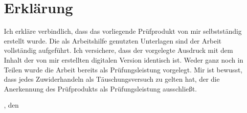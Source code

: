 \chapter{Erklärung}\label{ch:erklaerung}
Ich erkläre verbindlich, dass das vorliegende Prüfprodukt von mir selbstständig erstellt wurde.
Die als Arbeitshilfe genutzten Unterlagen sind der Arbeit vollständig aufgeführt.
Ich versichere, dass der vorgelegte Ausdruck mit dem Inhalt der von mir erstellten digitalen Version identisch ist.
Weder ganz noch in Teilen wurde die Arbeit bereits als Prüfungsleistung vorgelegt.
Mir ist bewusst, dass jedes Zuwiderhandeln als Täuschungsversuch zu gelten hat, der die Anerkennung des Prüfprodukts als Prüfungsleistung ausschließt.
\bigskip

\begingroup
\setlength{\parindent}{0pt} %

\locationDocument, den \dateDocument
\bigskip
\bigskip

\newlength{\widthbox}
\settowidth{\widthbox}{\locationDocument, den \dateDocument}

\makebox[\widthbox]{\hrulefill}\\
\authorDocument
\endgroup

